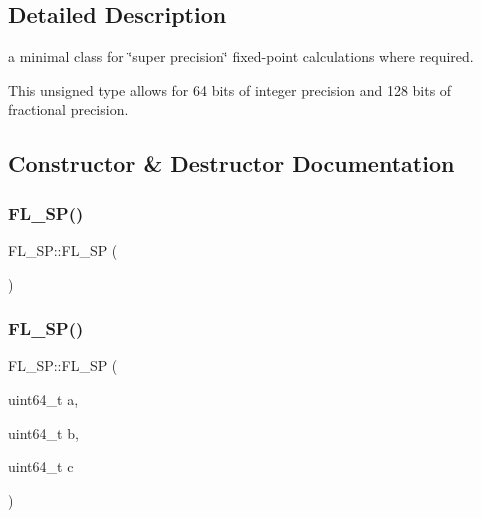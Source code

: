 \subsection{Detailed Description}
a minimal class for \char`\"{}super precision\char`\"{} fixed-\/point calculations where required. 

This unsigned type allows for 64 bits of integer precision and 128 bits of fractional precision. 

\subsection{Constructor \& Destructor Documentation}
\mbox{\label{struct_f_l___s_p_a862ed441d9da9edd82d368ee09686d63}} 
\subsubsection{\texorpdfstring{F\+L\+\_\+\+S\+P()}{FL\_SP()}\hspace{0.1cm}{\footnotesize\ttfamily [1/2]}}
{\footnotesize\ttfamily F\+L\+\_\+\+S\+P\+::\+F\+L\+\_\+\+SP (\begin{DoxyParamCaption}{ }\end{DoxyParamCaption})\hspace{0.3cm}{\ttfamily [inline]}}

\mbox{\label{struct_f_l___s_p_ac5e188b9e44e98f6311b6969bb1658be}} 
\subsubsection{\texorpdfstring{F\+L\+\_\+\+S\+P()}{FL\_SP()}\hspace{0.1cm}{\footnotesize\ttfamily [2/2]}}
{\footnotesize\ttfamily F\+L\+\_\+\+S\+P\+::\+F\+L\+\_\+\+SP (\begin{DoxyParamCaption}\item[{uint64\+\_\+t}]{a,  }\item[{uint64\+\_\+t}]{b,  }\item[{uint64\+\_\+t}]{c }\end{DoxyParamCaption})\hspace{0.3cm}{\ttfamily [inline]}}



